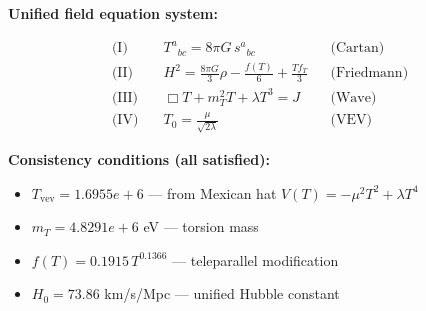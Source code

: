 
\textbf{Unified field equation system:}

\begin{align}
  \text{(I)} \quad & T^a{}_{bc} = 8\pi G \, s^a{}_{bc} && \text{(Cartan)} \\
  \text{(II)} \quad & H^2 = \frac{8\pi G}{3}\rho - \frac{f(T)}{6} + \frac{Tf_T}{3} && \text{(Friedmann)} \\
  \text{(III)} \quad & \Box T + m_T^2 T + \lambda T^3 = J && \text{(Wave)} \\
  \text{(IV)} \quad & T_0 = \frac{\mu}{\sqrt{2\lambda}} && \text{(VEV)}
\end{align}

\textbf{Consistency conditions (all satisfied):}
\begin{itemize}
  \item $T_{\text{vev}} = 1.6955e+6$ — from Mexican hat $V(T) = -\mu^2 T^2 + \lambda T^4$
  \item $m_T = 4.8291e+6$ eV — torsion mass
  \item $f(T) = 0.1915 \, T^{0.1366}$ — teleparallel modification
  \item $H_0 = 73.86$ km/s/Mpc — unified Hubble constant
\end{itemize}